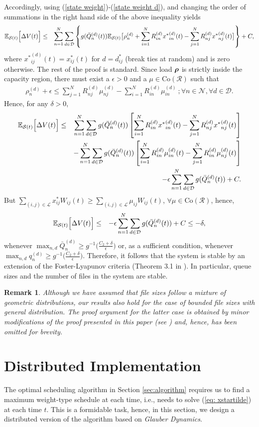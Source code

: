 \documentclass[10pt,onecolumn,draftclsnofoot,journal]{IEEEtran}
\newtheorem{remark}{Remark}
\newcommand{\brho}{\mbox{\boldmath$\rho$}}
\newcommand{\mD} {\mathcal{D}}
\newcommand{\mS}{\mathcal{S}}
\newcommand{\be}{\begin{eqnarray}}
\newcommand{\ee}{\end{eqnarray}}
\newcommand{\ben}{\begin{eqnarray*}}
\newcommand{\een}{\end{eqnarray*}}
\newcommand{\expectS}[1]{{\mathbb E_{\mathcal{S}(t)}} \Bigl[ #1\Bigr]}
\begin{document}
Accordingly, using (\ref{state weight})-(\ref{state weight d}), and changing the order of summations in the right hand side of the above inequality yields
\ben
\expectS{\Delta V(t)}  &\leq& \sum_{n=1}^N\sum_{d \in \mD} \left\{g(\bar{Q}_n^{(d)}(t))\mathbb{E}_{\mS(t)}\bigl[\rho_n^{(d)}+\sum_{i=1}^NR^{(d)}_{in} {x^*}_{in}^{(d)}(t)-\sum_{j=1}^NR^{(d)}_{nj} {x^*}_{nj}^{(d)}(t)\bigr]\right\} + C,
\een
where ${x^*}_{ij}^{(d)}(t)=x^*_{ij}(t)$ for $d = d^*_{ij}$ (break ties at random) and is zero otherwise.
The rest of the proof is standard. Since load $\brho$ is strictly inside the capacity region, there must exist a $\epsilon >0$ and a $\mu \in \mbox{Co}(\mathcal{R})$ such that
\be
\rho_n^{(d)}+\epsilon \leq \sum_{j=1}^NR^{(d)}_{nj} {\mu}_{nj}^{(d)}-\sum_{i=1}^N R^{(d)}_{in}{\mu}_{in}^{(d)}\ ; \forall n \in \mathcal{N} ,\forall d \in \mD.
\ee
Hence, for any $\delta>0$,
\ben
\expectS{\Delta V(t)} &\leq& \sum_{n=1}^N\sum_{d \in \mD}g(\bar{Q}_n^{(d)}(t))\left[\sum_{i=1}^NR^{(d)}_{in} {x^*}_{in}^{(d)}(t)-\sum_{j=1}^N R^{(d)}_{nj} {x^*}_{nj}^{(d)}(t)\right]\\
&& -  \sum_{n=1}^N\sum_{d \in \mD}g(\bar{Q}_n^{(d)}(t))\left[\sum_{i=1}^NR^{(d)}_{in} {\mu}_{in}^{(d)}(t)-\sum_{j=1}^N R^{(d)}_{in}{\mu}_{nj}^{(d)}(t)\right]\\
&& - \epsilon\sum_{n=1}^N\sum_{d \in \mD}g(\bar{Q}_n^{(d)}(t)) + C .
\een
But $\sum _{(i,j) \in \mathcal{L}}x^*_{ij}W_{ij}(t) \geq \sum _{(i,j) \in \mathcal{L}}\mu_{ij} W_{ij}(t)$, $\forall \mu \in \mathrm{Co}(\mathcal{R})$, hence,
\ben
\expectS{\Delta V(t)} &\leq&  -\epsilon \sum_{n=1}^N\sum_{d \in \mD}g(\bar{Q}_n^{(d)}(t)) + C
\leq - \delta,
\een
whenever $\max_{n,d}\bar{Q}_n^{(d)} \geq g^{-1}\big(\frac{C_2+\delta}{\epsilon}\big)$ or, as a sufficient condition, whenever $\max_{n,d}q_n^{(d)} \geq g^{-1}\big(\frac{C_2+\delta}{\epsilon}\big)$. Therefore, it follows that the system is stable by an extension of the Foster-Lyapunov criteria \cite{asm} (Theorem 3.1 in \cite{eph}). In particular, queue sizes and the number of files in the system are stable.
\begin{remark}
Although we have assumed that file sizes follow a mixture of geometric distributions, our results also hold for the case of bounded file sizes with general distribution. The proof argument for the latter case is obtained by minor modifications of the proof presented in this paper (see \cite{javad}) and, hence, has been omitted for brevity.
\end{remark}

\section{Distributed Implementation}\label{sec: distributed}
The optimal scheduling algorithm in Section \ref{sec:algorithm} requires us to find a maximum weight-type schedule at each time, i.e., needs to solve (\ref{eq: xstartilde}) at each time $t$. This is a formidable task, hence, in this section, we design a distributed version of the algorithm based on \textit{Glauber Dynamics}.
\end{document}
